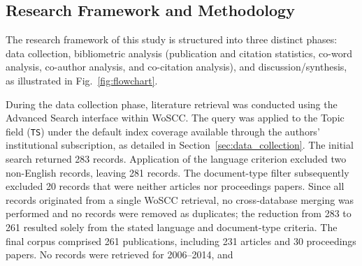 \documentclass[]{interact}
\theoremstyle{plain}%
\theoremstyle{definition}
\theoremstyle{remark}
\DeclareRobustCommand{\DIFadd}[1]{{\protect\color{DIFaddcolor}\uwave{#1}}}
\DeclareRobustCommand{\DIFdel}[1]{{\protect\color{DIFdelcolor}\sout{#1}}}
\def\DIFadd#1{#1}%
\def\DIFdel#1{}%
\begin{document}
\subsection{Research Framework and Methodology}
\label{sec:fusion_coding}
\label{sec:methodology}

The research framework of this study is structured into three distinct phases: data collection, bibliometric analysis \DIFadd{(}\DIFadd{publication} \DIFadd{and} \DIFadd{citation} \DIFadd{statistics}\DIFadd{,} \DIFadd{co-word} \DIFadd{analysis}\DIFadd{,} \DIFadd{co-author} \DIFadd{analysis}\DIFadd{,} \DIFadd{and} \DIFadd{co-citation} \DIFadd{analysis}\DIFadd{)}, and discussion/synthesis, as illustrated in Fig.~\ref{fig:flowchart}.

During the data collection phase, literature retrieval was conducted using the \DIFdel{advanced} \DIFdel{search} \DIFdel{function} \DIFadd{Advanced} \DIFadd{Search} \DIFadd{interface} within \DIFadd{WoSCC}\DIFadd{.} \DIFadd{The} \DIFadd{query} \DIFadd{was} \DIFadd{applied} \DIFadd{to} the \DIFdel{Web} \DIFdel{of} \DIFdel{Science} \DIFdel{Core} \DIFdel{Collection} \DIFadd{Topic} \DIFadd{field} \DIFadd{(}\texttt{\DIFadd{TS}}\DIFadd{)} \DIFadd{under} \DIFadd{the} \DIFadd{default} \DIFadd{index} \DIFadd{coverage} \DIFadd{available} \DIFadd{through} \DIFadd{the} \DIFadd{authors'} \DIFadd{institutional} \DIFadd{subscription}, \DIFdel{with} \DIFdel{the} \DIFdel{specific} \DIFdel{search} \DIFdel{strategy} \DIFadd{as} detailed in Section~\ref{sec:data_collection}. \DIFdel{An} \DIFadd{The} initial \DIFdel{screening} \DIFadd{search} \DIFadd{returned} \DIFadd{283} \DIFadd{records}\DIFadd{.} \DIFadd{Application} \DIFadd{of} \DIFadd{the} \DIFadd{language} \DIFadd{criterion} \DIFadd{excluded} \DIFadd{two} \DIFadd{non-English} \DIFadd{records}\DIFadd{,} \DIFadd{leaving} \DIFadd{281} \DIFadd{records}\DIFadd{.} \DIFadd{The} \DIFadd{document-type} \DIFadd{filter} \DIFadd{subsequently} \DIFadd{excluded} \DIFadd{20} \DIFadd{records} \DIFadd{that} \DIFadd{were} \DIFadd{neither} \DIFadd{articles} \DIFadd{nor} \DIFadd{proceedings} \DIFadd{papers}\DIFadd{.} \DIFadd{Since} \DIFadd{all} \DIFadd{records} \DIFadd{originated} \DIFadd{from} \DIFadd{a} \DIFadd{single} \DIFadd{WoSCC} \DIFadd{retrieval}\DIFadd{,} \DIFadd{no} \DIFadd{cross-database} \DIFadd{merging} was performed \DIFdel{based} \DIFdel{on} \DIFadd{and} \DIFadd{no} \DIFadd{records} \DIFadd{were} \DIFadd{removed} \DIFadd{as} \DIFadd{duplicates}\DIFadd{;} \DIFadd{the} \DIFadd{reduction} \DIFadd{from} \DIFadd{283} \DIFadd{to} \DIFadd{261} \DIFadd{resulted} \DIFadd{solely} \DIFadd{from} \DIFadd{the} \DIFadd{stated} language \DIFdel{(}\DIFdel{limited} \DIFdel{to} \DIFdel{English}\DIFdel{)} and \DIFdel{document} \DIFdel{type} \DIFdel{(}\DIFdel{excluding} \DIFdel{Review} \DIFdel{Articles} \DIFadd{document-type} \DIFadd{criteria}\DIFadd{.} \DIFadd{The} \DIFadd{final} \DIFadd{corpus} \DIFadd{comprised} \DIFadd{261} \DIFadd{publications}, \DIFdel{Early} \DIFdel{Access}\DIFdel{,} \DIFdel{Retracted} \DIFdel{Publications} \DIFadd{including} \DIFadd{231} \DIFadd{articles} \DIFadd{and} \DIFadd{30} \DIFadd{proceedings} \DIFadd{papers}\DIFadd{.} \DIFadd{No} \DIFadd{records} \DIFadd{were} \DIFadd{retrieved} \DIFadd{for} \DIFadd{2006--2014}, and \DIFdel{Editorial} 
\end{document}
